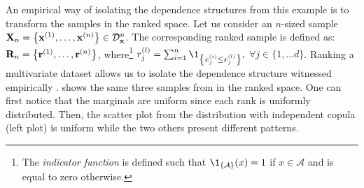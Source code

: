 An empirical way of isolating the dependence structures from this example is to transform the samples in the ranked space. 
Let us consider an $n$-sized sample ${\bf X}_n = \left\{{\bf x}^{(1)}, \dots, {\bf x}^{(n)}\right\} \in \mathcal{D}_{{\bf x}}^{n}$. 
The corresponding ranked sample is defined as: ${\bf R}_n = \left\{{\bf r}^{(1)}, \dots, {\bf r}^{(n)}\right\}$, 
where\footnote{The \textit{indicator function} is defined such that $\1_{\left\{\mathcal{A}\right\}}(x) = 1$ if $x \in \mathcal{A}$ and is equal to zero otherwise.} 
$r^{(l)}_j = \sum_{i=1}^n \1_{\left\{x^{(i)}_j \leq x^{(l)}_j\right\}},$ $\forall j \in \{1, \dots d\}$. 
Ranking a multivariate dataset allows us to isolate the dependence structure witnessed empirically \citep{saporta_2006}. 
 shows the same three samples from  in the ranked space. 
One can first notice that the marginals are uniform since each rank is uniformly distributed. 
Then, the scatter plot from the distribution with independent copula (left plot) is uniform while the two others present different patterns. 
